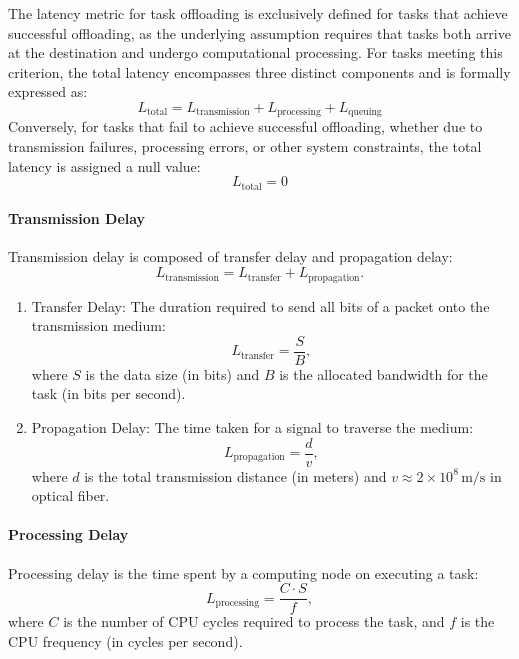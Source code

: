 \documentclass[preprint,3p,authoryear]{elsarticle}
\begin{document}
The latency metric for task offloading is exclusively defined for tasks that achieve successful offloading, as the underlying assumption requires that tasks both arrive at the destination and undergo computational processing. For tasks meeting this criterion, the total latency encompasses three distinct components and is formally expressed as:
\begin{equation}
L_{\text{total}} = L_{\text{transmission}} + L_{\text{processing}} + L_{\text{queuing}}
\end{equation}
Conversely, for tasks that fail to achieve successful offloading, whether due to transmission failures, processing errors, or other system constraints, the total latency is assigned a null value:
\begin{equation}
L_{\text{total}} = 0
\end{equation}

\paragraph{Transmission Delay}
Transmission delay is composed of transfer delay and propagation delay:
\begin{equation}
L_{\text{transmission}} = L_{\text{transfer}} + L_{\text{propagation}}.
\end{equation}

\begin{enumerate}
    \item Transfer Delay: The duration required to send all bits of a packet onto the transmission medium:
    \begin{equation}
    L_{\text{transfer}} = \frac{S}{B},
    \end{equation}
    where \( S \) is the data size (in bits) and \( B \) is the allocated bandwidth for the task (in bits per second).

    \item Propagation Delay: The time taken for a signal to traverse the medium:
    \begin{equation}
    L_{\text{propagation}} = \frac{d}{v},
    \end{equation}
    where \( d \) is the total transmission distance (in meters) and \( v \approx 2 \times 10^8 \,\text{m/s}\) in optical fiber.
\end{enumerate}

\paragraph{Processing Delay}
Processing delay is the time spent by a computing node on executing a task:
\begin{equation}
L_{\text{processing}} = \frac{C \cdot S}{f},
\end{equation}
where \( C \) is the number of CPU cycles required to process the task, and \( f \) is the CPU frequency (in cycles per second).
\end{document}
